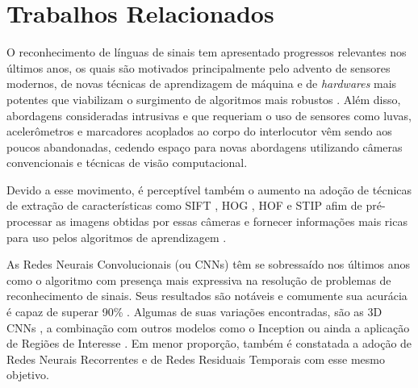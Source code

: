 \section{Trabalhos Relacionados} %
\label{sec:trabalhos-relacionados}

O reconhecimento de línguas de sinais tem apresentado progressos relevantes nos últimos anos, os quais são motivados principalmente pelo advento de sensores modernos, de novas técnicas de aprendizagem de máquina e de \textit{hardwares} mais potentes que viabilizam o surgimento de algoritmos mais robustos \cite{recent-advances-dl-2017, recent-advances-sl-2013}. Além disso, abordagens consideradas intrusivas e que requeriam o uso de sensores como luvas, acelerômetros e marcadores acoplados ao corpo do interlocutor vêm sendo aos poucos abandonadas, cedendo espaço para novas abordagens utilizando câmeras convencionais e técnicas de visão computacional. 

Devido a esse movimento, é perceptível também o aumento na adoção de técnicas de extração de características como SIFT \cite{lowe-2004}, HOG \cite{dalal-2005}, HOF \cite{laptev-2008} e STIP \cite{laptev-2008} \cite{recent-advances-dl-2017} afim de pré-processar as imagens obtidas por essas câmeras e fornecer informações mais ricas para uso pelos algoritmos de aprendizagem \cite{lim-2016, shanta-2018}.


As Redes Neurais Convolucionais (ou CNNs) têm se sobressaído nos últimos anos como o algoritmo com presença mais expressiva na resolução de problemas de reconhecimento de sinais. Seus resultados são notáveis e comumente sua acurácia é capaz de superar 90\%  \cite{shanta-2018, ji-2017, taskiran-2018, rao-2018}. Algumas de suas variações encontradas, são as 3D CNNs \cite{elbadawy-2017}, a combinação com outros modelos como o Inception \cite{das-2018} ou ainda a aplicação de Regiões de Interesse \cite{sajanraj-2018}. Em menor proporção, também é constatada a adoção de Redes Neurais Recorrentes \cite{konstantinidis-2018} e de Redes Residuais Temporais \cite{pigou-2017} com esse mesmo objetivo.

